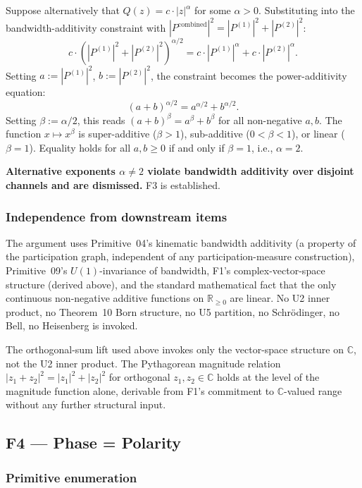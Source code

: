 \documentclass[11pt,a4paper]{article}
\begin{document}
Suppose alternatively that $Q(z) = c \cdot |z|^\alpha$ for some $\alpha > 0$. Substituting into the bandwidth-additivity constraint with $|P^\mathrm{combined}|^2 = |P^{(1)}|^2 + |P^{(2)}|^2$:
\[
c \cdot (|P^{(1)}|^2 + |P^{(2)}|^2)^{\alpha/2} = c \cdot |P^{(1)}|^\alpha + c \cdot |P^{(2)}|^\alpha.
\]
Setting $a := |P^{(1)}|^2$, $b := |P^{(2)}|^2$, the constraint becomes the power-additivity equation:
\[
(a + b)^{\alpha/2} = a^{\alpha/2} + b^{\alpha/2}.
\]
Setting $\beta := \alpha/2$, this reads $(a+b)^\beta = a^\beta + b^\beta$ for all non-negative $a, b$. The function $x \mapsto x^\beta$ is super-additive ($\beta > 1$), sub-additive ($0 < \beta < 1$), or linear ($\beta = 1$). Equality holds for all $a, b \geq 0$ if and only if $\beta = 1$, i.e., $\alpha = 2$.

\textbf{Alternative exponents $\alpha \neq 2$ violate bandwidth additivity over disjoint channels and are dismissed.} F3 is established.

\subsubsection{Independence from downstream items}

The argument uses Primitive~04's kinematic bandwidth additivity (a property of the participation graph, independent of any participation-measure construction), Primitive~09's $U(1)$-invariance of bandwidth, F1's complex-vector-space structure (derived above), and the standard mathematical fact that the only continuous non-negative additive functions on $\mathbb{R}_{\geq 0}$ are linear. No U2 inner product, no Theorem~10 Born structure, no U5 partition, no Schr\"odinger, no Bell, no Heisenberg is invoked.

The orthogonal-sum lift used above invokes only the vector-space structure on $\mathbb{C}$, not the U2 inner product. The Pythagorean magnitude relation $|z_1 + z_2|^2 = |z_1|^2 + |z_2|^2$ for orthogonal $z_1, z_2 \in \mathbb{C}$ holds at the level of the magnitude function alone, derivable from F1's commitment to $\mathbb{C}$-valued range without any further structural input.

\subsection{F4 --- Phase = Polarity}\label{sec:F4}

\subsubsection{Primitive enumeration}
\end{document}
